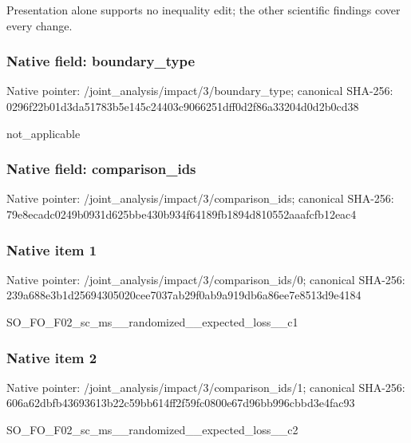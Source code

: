 \documentclass[10pt,a4paper]{article}
\begin{document}
\begingroup\raggedright\sloppy Presentation alone supports no inequality edit;\allowbreak{} the other scientific findings cover every change.\par\endgroup

\subsubsection{Native field: boundary\_\allowbreak{}type}
Native pointer: /joint\_\allowbreak{}analysis/impact/3/boundary\_\allowbreak{}type; canonical SHA-256: 0296f22b01d3da51783b5e145c24403c9066251dff0d2f86a33204d0d2b0cd38

\begingroup\raggedright\sloppy not\_\allowbreak{}applicable\par\endgroup

\subsubsection{Native field: comparison\_\allowbreak{}ids}
Native pointer: /joint\_\allowbreak{}analysis/impact/3/comparison\_\allowbreak{}ids; canonical SHA-256: 79e8ecadc0249b0931d625bbe430b934f64189fb1894d810552aaafcfb12eac4

\subsubsection{Native item 1}
Native pointer: /joint\_\allowbreak{}analysis/impact/3/comparison\_\allowbreak{}ids/0; canonical SHA-256: 239a688e3b1d25694305020cee7037ab29f0ab9a919db6a86ee7e8513d9e4184

\begingroup\raggedright\sloppy SO\_\allowbreak{}FO\_\allowbreak{}F02\_\allowbreak{}sc\_\allowbreak{}ms\_\allowbreak{}\_\allowbreak{}randomized\_\allowbreak{}\_\allowbreak{}expected\_\allowbreak{}loss\_\allowbreak{}\_\allowbreak{}c1\par\endgroup

\subsubsection{Native item 2}
Native pointer: /joint\_\allowbreak{}analysis/impact/3/comparison\_\allowbreak{}ids/1; canonical SHA-256: 606a62dbfb43693613b22c59bb614ff2f59fc0800e67d96bb996cbbd3e4fac93

\begingroup\raggedright\sloppy SO\_\allowbreak{}FO\_\allowbreak{}F02\_\allowbreak{}sc\_\allowbreak{}ms\_\allowbreak{}\_\allowbreak{}randomized\_\allowbreak{}\_\allowbreak{}expected\_\allowbreak{}loss\_\allowbreak{}\_\allowbreak{}c2\par\endgroup
\end{document}
